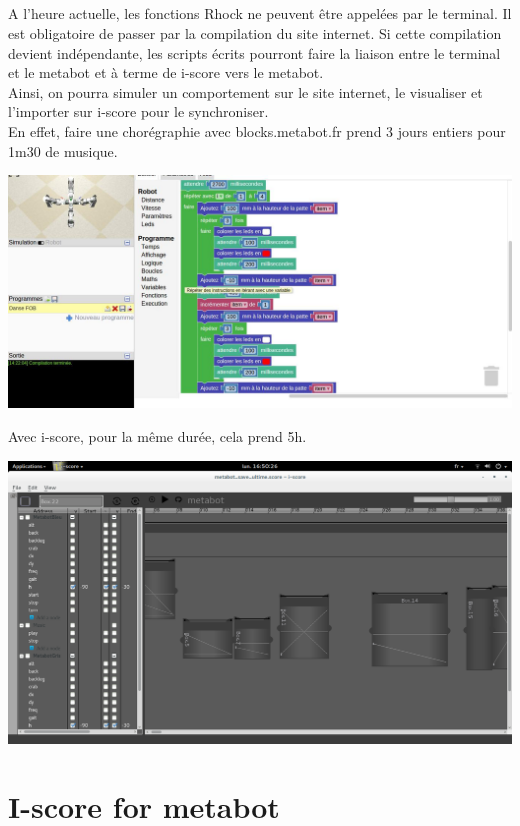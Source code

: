 \documentclass[10pt,a4paper]{report}
\begin{document}
\paragraph{}
A l'heure actuelle, les fonctions Rhock ne peuvent être appelées par le terminal. Il est obligatoire de passer par la compilation du site internet. Si cette compilation devient indépendante, les scripts écrits pourront faire la liaison entre le terminal et le metabot et à terme de i-score vers le metabot.
\\
Ainsi, on pourra simuler un comportement sur le site internet, le visualiser et l'importer sur i-score pour le synchroniser.
\\
En effet, faire une chorégraphie avec blocks.metabot.fr prend 3 jours entiers pour 1m30 de musique. 
\begin{center}
\includegraphics[scale=0.2]{image/site.jpg}
\end{center}
Avec i-score, pour la même durée, cela prend 5h.

\begin{center}
\includegraphics[scale=0.2]{image/danse.png}
\end{center}

\chapter{I-score for metabot}
\end{document}
